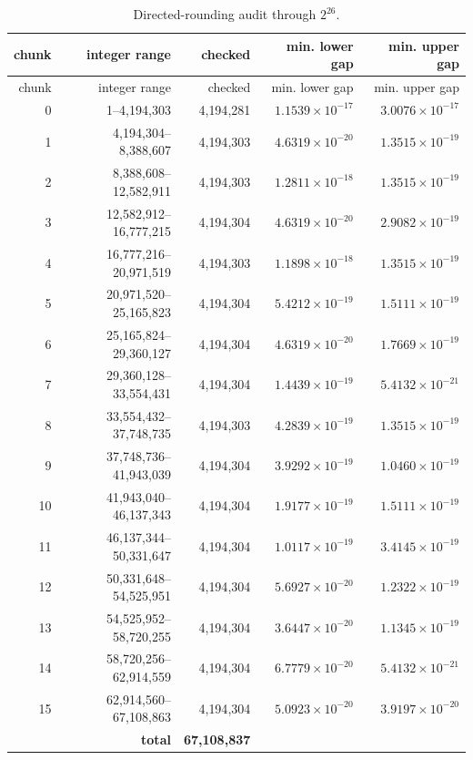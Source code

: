 \documentclass[11pt,oneside]{article}
\theoremstyle{definition}
\begin{document}
\begin{longtable}{@{}r r r r r@{}}
\caption{Directed-rounding audit through \(2^{26}\).}\label{tab:chunk-audit}\\
\toprule
chunk & integer range & checked & min. lower gap & min. upper gap\\
\midrule
\endfirsthead
\toprule
chunk & integer range & checked & min. lower gap & min. upper gap\\
\midrule
\endhead
0 & 1--4{,}194{,}303 & 4{,}194{,}281 & $1.1539\times10^{-17}$ & $3.0076\times10^{-17}$ \\
1 & 4{,}194{,}304--8{,}388{,}607 & 4{,}194{,}303 & $4.6319\times10^{-20}$ & $1.3515\times10^{-19}$ \\
2 & 8{,}388{,}608--12{,}582{,}911 & 4{,}194{,}303 & $1.2811\times10^{-18}$ & $1.3515\times10^{-19}$ \\
3 & 12{,}582{,}912--16{,}777{,}215 & 4{,}194{,}304 & $4.6319\times10^{-20}$ & $2.9082\times10^{-19}$ \\
4 & 16{,}777{,}216--20{,}971{,}519 & 4{,}194{,}303 & $1.1898\times10^{-18}$ & $1.3515\times10^{-19}$ \\
5 & 20{,}971{,}520--25{,}165{,}823 & 4{,}194{,}304 & $5.4212\times10^{-19}$ & $1.5111\times10^{-19}$ \\
6 & 25{,}165{,}824--29{,}360{,}127 & 4{,}194{,}304 & $4.6319\times10^{-20}$ & $1.7669\times10^{-19}$ \\
7 & 29{,}360{,}128--33{,}554{,}431 & 4{,}194{,}304 & $1.4439\times10^{-19}$ & $5.4132\times10^{-21}$ \\
8 & 33{,}554{,}432--37{,}748{,}735 & 4{,}194{,}303 & $4.2839\times10^{-19}$ & $1.3515\times10^{-19}$ \\
9 & 37{,}748{,}736--41{,}943{,}039 & 4{,}194{,}304 & $3.9292\times10^{-19}$ & $1.0460\times10^{-19}$ \\
10 & 41{,}943{,}040--46{,}137{,}343 & 4{,}194{,}304 & $1.9177\times10^{-19}$ & $1.5111\times10^{-19}$ \\
11 & 46{,}137{,}344--50{,}331{,}647 & 4{,}194{,}304 & $1.0117\times10^{-19}$ & $3.4145\times10^{-19}$ \\
12 & 50{,}331{,}648--54{,}525{,}951 & 4{,}194{,}304 & $5.6927\times10^{-20}$ & $1.2322\times10^{-19}$ \\
13 & 54{,}525{,}952--58{,}720{,}255 & 4{,}194{,}304 & $3.6447\times10^{-20}$ & $1.1345\times10^{-19}$ \\
14 & 58{,}720{,}256--62{,}914{,}559 & 4{,}194{,}304 & $6.7779\times10^{-20}$ & $5.4132\times10^{-21}$ \\
15 & 62{,}914{,}560--67{,}108{,}863 & 4{,}194{,}304 & $5.0923\times10^{-20}$ & $3.9197\times10^{-20}$ \\
\midrule
\multicolumn{2}{r}{\textbf{total}} & \textbf{67{,}108{,}837} & & \\
\bottomrule
\end{longtable}
\end{document}
